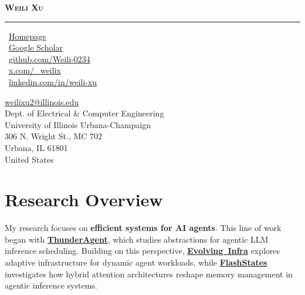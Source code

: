 \documentclass[a4paper,11pt]{article}
\newcommand{\sepspace}{\vspace{6pt}}
\newcommand{\link}[2]{\textcolor{black}{\href{#1}{\textbf{#2}}}}
\begin{document}
\begin{center}
    \Large{\textbf{\textsc{Weili Xu}}}
\end{center}
\vspace{-18pt}
\noindent\rule{\textwidth}{0.4pt}
\vspace{0.5em}
\noindent
\begin{minipage}[t]{0.45\textwidth}
\setlength{\baselineskip}{1.25\baselineskip}
\faHome~\textcolor{linkpink}{\href{https://weilixu.com/}{Homepage}}\\
\faGoogle~\textcolor{linkpink}{\href{https://scholar.google.com/citations?user=gDqEGEUAAAAJ}{Google Scholar}}\\
\faGithub~\textcolor{linkpink}{\href{https://github.com/Weili-0234}{github.com/Weili-0234}}\\
\faTwitter~\textcolor{linkpink}{\href{https://x.com/_weilix/}{x.com/\_weilix}}\\
\faLinkedin~\textcolor{linkpink}{\href{https://www.linkedin.com/in/weili-xu/}{linkedin.com/in/weili-xu}}
\end{minipage}%
\hfill\begin{minipage}[t]{0.55\textwidth}
\raggedleft
\href{mailto:weilixu2@illinois.edu}{weilixu2@illinois.edu}\\
Dept. of Electrical \& Computer Engineering\\
University of Illinois Urbana-Champaign\\
306 N. Wright St., MC 702\\
Urbana, IL 61801\\
United States
\end{minipage}

\section*{Research Overview}
\begingroup\setlength{\emergencystretch}{3em}\lsstyle
My research focuses on \textbf{efficient systems for AI agents}. This line of work began with \mbox{\link{https://thunderagent.ai/}{ThunderAgent}}, which studies abstractions for agentic LLM inference scheduling. Building on this perspective, \mbox{\link{https://inference-rsi.com/}{Evolving Infra}} explores adaptive infrastructure for dynamic agent workloads, while \mbox{\link{https://flashstates.ai/}{FlashStates}} \mbox{investigates} how hybrid attention architectures reshape memory management in agentic inference systems.

\par\endgroup
\sepspace
\end{document}
